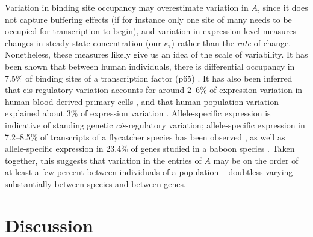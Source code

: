 \documentclass{article}
\newcommand{\1}{\mathbbm{1}}
\begin{document}
Variation in binding site occupancy may overestimate variation in $A$,
since it does not capture buffering effects (if for instance only one site of many needs to be occupied for transcription to begin),
and variation in expression level measures changes in steady-state concentration (our $\kappa_i$) rather than the \emph{rate} of change.
Nonetheless, these measures likely give us an idea of the scale of variability.
It has been shown that between human individuals, there is differential occupancy in 7.5\%
of binding sites of a transcription factor (p65) \citep{kasowski2010variation}.
It has also been inferred that cis-regulatory variation
accounts for around 2--6\% of expression variation in human blood-derived primary cells \citep{verlaan2009targeted}, and
that human population variation 
explained about 3\% of expression variation \citep{lappalainen2013transcriptome}.
Allele-specific expression is indicative of standing genetic \emph{cis}-regulatory variation;
allele-specific expression in 7.2--8.5\% of transcripts of a flycatcher species has been observed \citep{wang2017bayesian}, as well as
allele-specific expression in 23.4\% of genes studied in a baboon species \citep{tung2015genetic}. 
Taken together, this suggests that variation in the entries of $A$
may be on the order of at least a few percent between individuals of a population --
doubtless varying substantially between species and between genes.

\section*{Discussion}

\end{document}
